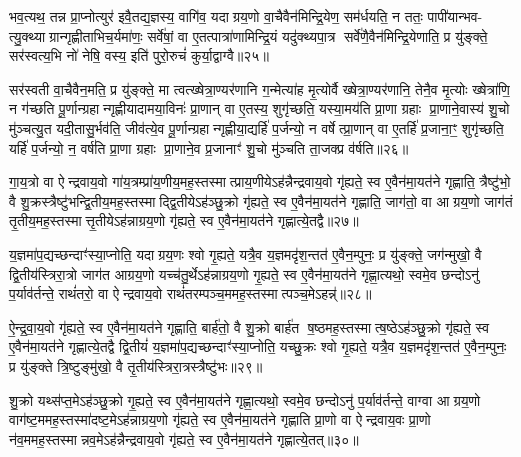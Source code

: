भव॒त्यथ॒ तन्न प्रा॒प्नोत्युर॑ इवै॒तद्य॒ज्ञस्य॒ वागि॑व॒ यदाग्रय॒णो वा॒चैवैन॑मिन्द्रि॒येण॒ सम॑र्धयति॒ न ततः॒ पापी॑यान्भव- त्यु॒क्थ्याग्रान्गृह्णीताभिच॒र्यमा॑णः॒ सर्वे॑षां॒ वा ए॒तत्पात्रा॑णामिन्द्रि॒यं यदु॑क्थ्यपा॒त्र सर्वे॑णै॒वैन॑मिन्द्रि॒येणाति॒ प्र यु॑ङ्क्ते॒ सर॑स्वत्य॒भि नो॑ नेषि॒ वस्य॒ इति॑ पुरो॒रुचं॑ कुर्या॒द्वाग्वै॥२५॥

सर॑स्वती वा॒चैवैन॒मति॒ प्र यु॑ङ्क्ते॒ मा त्वत्ख्षेत्रा॒ण्यर॑णानि ग॒न्मेत्या॑ह मृ॒त्योर्वै ख्षेत्रा॒ण्यर॑णानि॒ तेनै॒व मृ॒त्योः ख्षेत्रा॑णि॒ न ग॑च्छति पू॒र्णान्ग्रहान्गृह्णीयादामया॒विनः॑ प्रा॒णान् वा ए॒तस्य॒ शुगृ॑च्छति॒ यस्या॒मय॑ति प्रा॒णा ग्रहाः प्रा॒णाने॒वास्य॑ शु॒चो मु॑ञ्चत्यु॒त यदी॒तासु॒र्भव॑ति॒ जीव॑त्ये॒व पू॒र्णान्ग्रहान्गृह्णीया॒द्यर्\mbox{}हि॑ प॒र्जन्यो॒ न वर्\mbox{}षेत्प्रा॒णान् वा ए॒तर्\mbox{}हि॑ प्र॒जाना॒ꣳ॒ शुगृ॑च्छति॒ यर्\mbox{}हि॑ प॒र्जन्यो॒ न॒ वर्\mbox{}ष॑ति प्रा॒णा ग्रहाः प्रा॒णाने॒व प्र॒जानाꣳ॑ शु॒चो मु॑ञ्चति ता॒जक्प्र व॑र्\mbox{}षति॥२६॥

{\anuvakamend[{प्र॒मीये॑त मनु॒ष्य॑ ऋध्यते॒ यस्य॑ पि॒ता पि॑ताम॒हः पुण्यो॒ वाग्वा ए॒व पू॒र्णान्ग्रहा॒न्पञ्च॑विशतिश्च॥७॥}]}

गा॒य॒त्रो वा ऐन्द्रवाय॒वो गा॑य॒त्रम्प्रा॑य॒णीय॒मह॒स्तस्मात्प्राय॒णीयेऽह॑न्नैन्द्रवाय॒वो गृ॑ह्यते॒ स्व ए॒वैन॑मा॒यत॑ने गृह्णाति॒ त्रैष्टु॑भो॒ वै शु॒क्रस्त्रैष्टु॑भन्द्वि॒तीय॒मह॒स्तस्माद्द्वि॒तीयेऽह॑ञ्छु॒क्रो गृ॑ह्यते॒ स्व ए॒वैन॑मा॒यत॑ने गृह्णाति॒ जाग॑तो॒ वा आग्रय॒णो जाग॑तं तृ॒तीय॒मह॒स्तस्मात्तृ॒तीयेऽह॑न्नाग्रय॒णो गृ॑ह्यते॒ स्व ए॒वैन॑मा॒यत॑ने गृह्णात्ये॒तद्वै॥२७॥

य॒ज्ञमा॑प॒द्यच्छन्दाꣳ॑स्या॒प्नोति॒ यदाग्रय॒णः श्वो गृ॒ह्यते॒ यत्रै॒व य॒ज्ञमदृ॑श॒न्तत॑ ए॒वैन॒म्पुनः॒ प्र यु॑ङ्क्ते॒ जग॑न्मुखो॒ वै द्वि॒तीय॑स्त्रिरा॒त्रो जाग॑त आग्रय॒णो यच्च॑तु॒र्थेऽह॑न्नाग्रय॒णो गृ॒ह्यते॒ स्व ए॒वैन॑मा॒यत॑ने गृह्णा॒त्यथो॒ स्वमे॒व छन्दोऽनु॑ प॒र्याव॑र्तन्ते॒ राथं॑तरो॒ वा ऐन्द्रवाय॒वो राथं॑तरम्पञ्च॒ममह॒स्तस्मात्पञ्च॒मेऽहन्न्॑॥२८॥

ऐ॒न्द्र॒वा॒य॒वो गृ॑ह्यते॒ स्व ए॒वैन॑मा॒यत॑ने गृह्णाति॒ बार्\mbox{}ह॑तो॒ वै शु॒क्रो बार्\mbox{}ह॑त ष॒ष्ठमह॒स्तस्मात्ष॒ष्ठेऽह॑ञ्छु॒क्रो गृ॑ह्यते॒ स्व ए॒वैन॑मा॒यत॑ने गृह्णात्ये॒तद्वै द्वि॒तीयं॑ य॒ज्ञमा॑प॒द्यच्छन्दाꣳ॑स्या॒प्नोति॒ यच्छु॒क्रः श्वो गृ॒ह्यते॒ यत्रै॒व य॒ज्ञमदृ॑श॒न्तत॑ ए॒वैन॒म्पुनः॒ प्र यु॑ङ्क्ते त्रि॒ष्टुङ्मु॑खो॒ वै तृ॒तीय॑स्त्रिरा॒त्रस्त्रैष्टु॑भः॥२९॥

शु॒क्रो यथ्स॑प्त॒मेऽह॑ञ्छु॒क्रो गृ॒ह्यते॒ स्व ए॒वैन॑मा॒यत॑ने गृह्णा॒त्यथो॒ स्वमे॒व छन्दोऽनु॑ प॒र्याव॑र्तन्ते॒ वाग्वा आग्रय॒णो वाग॑ष्ट॒ममह॒स्तस्मा॑दष्ट॒मेऽह॑न्नाग्रय॒णो गृ॑ह्यते॒ स्व ए॒वैन॑मा॒यत॑ने गृह्णाति प्रा॒णो वा ऐन्द्रवाय॒वः प्रा॒णो न॑व॒ममह॒स्तस्मान्नव॒मेऽह॑न्नैन्द्रवाय॒वो गृ॑ह्यते॒ स्व ए॒वैन॑मा॒यत॑ने गृह्णात्ये॒तत्॥३०॥

